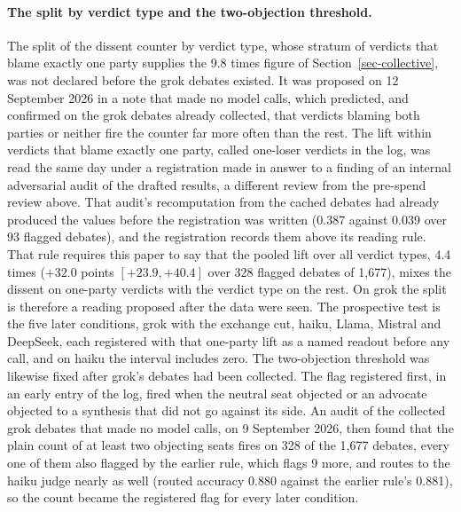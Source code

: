 \paragraph{The split by verdict type and the two-objection threshold.}
The split of the dissent counter by verdict type, whose stratum of verdicts
that blame exactly one party supplies the 9.8 times figure of
Section~\ref{sec-collective}, was not declared before the grok debates
existed. It was proposed on 12 September 2026 in a note that made no model
calls, which predicted, and confirmed on the grok debates
already collected, that verdicts blaming both parties or neither fire the
counter far more often than the rest. The lift within verdicts that blame
exactly one party, called one-loser verdicts in the log, was read the same
day under a registration made in answer to a finding of an internal
adversarial audit of the drafted results, a different review from the
pre-spend review above. That audit's recomputation from the cached debates
had already produced the values before the registration was written (0.387
against 0.039 over 93 flagged debates), and the registration records them
above its reading rule. That rule requires this paper to say that
the pooled lift over all verdict types, 4.4 times ($+32.0$ points
$[+23.9, +40.4]$ over 328 flagged debates of 1,677), mixes the dissent on
one-party verdicts with the verdict type on the rest.
On grok the split is therefore a reading proposed after the data were
seen. The prospective test is the five later conditions, grok with the exchange cut,
haiku, Llama, Mistral and DeepSeek, each registered with that one-party lift as a named readout before
any call, and on haiku the interval includes zero.
The two-objection threshold was likewise fixed after grok's debates had been
collected. The flag registered first, in an early entry of the log, fired
when the neutral seat objected or an advocate objected to a synthesis that
did not go against its side. An audit of the collected grok debates that
made no model calls, on 9 September 2026, then found that the plain count of
at least two objecting seats fires on 328 of the 1,677 debates, every one of them also flagged by
the earlier rule, which flags 9 more, and routes to the haiku judge nearly as
well (routed accuracy 0.880 against the earlier rule's 0.881), so the count
became the registered flag for every later condition.

